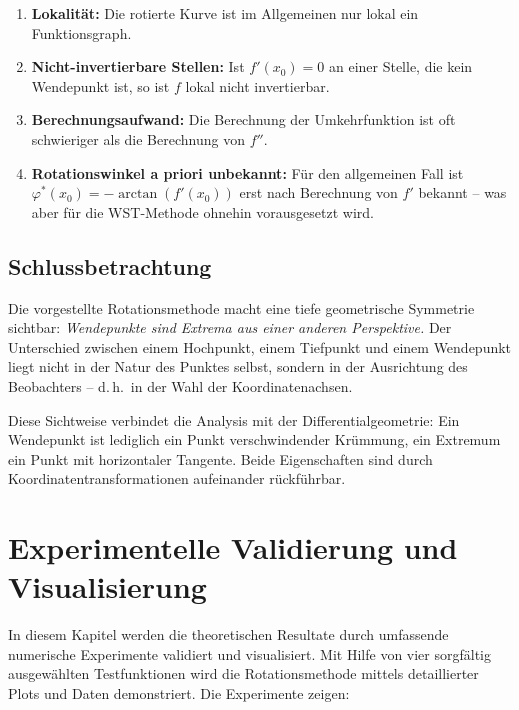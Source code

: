 ﻿\documentclass[12pt, a4paper]{article}
\theoremstyle{definition}
\begin{document}
	\begin{enumerate}[label=\arabic*.]
		\item \textbf{Lokalität:} Die rotierte Kurve ist im Allgemeinen nur lokal
		ein Funktionsgraph.
		
		\item \textbf{Nicht-invertierbare Stellen:} Ist $f'(x_0) = 0$ an einer
		Stelle, die kein Wendepunkt ist, so ist $f$ lokal nicht invertierbar.
		
		\item \textbf{Berechnungsaufwand:} Die Berechnung der Umkehrfunktion ist
		oft schwieriger als die Berechnung von $f''$.
		
		\item \textbf{Rotationswinkel a priori unbekannt:} Für den allgemeinen Fall
		ist $\varphi^*(x_0) = -\arctan(f'(x_0))$ erst nach Berechnung von $f'$
		bekannt -- was aber für die WST-Methode ohnehin vorausgesetzt wird.
	\end{enumerate}
	
	\subsection{Schlussbetrachtung}
	
	Die vorgestellte Rotationsmethode macht eine tiefe geometrische Symmetrie
	sichtbar: \emph{Wendepunkte sind Extrema aus einer anderen Perspektive.}
	Der Unterschied zwischen einem Hochpunkt, einem Tiefpunkt und einem
	Wendepunkt liegt nicht in der Natur des Punktes selbst, sondern in der
	Ausrichtung des Beobachters -- d.\,h.\ in der Wahl der Koordinatenachsen.
	
	Diese Sichtweise verbindet die Analysis mit der Differentialgeometrie: Ein
	Wendepunkt ist lediglich ein Punkt verschwindender Krümmung, ein Extremum
	ein Punkt mit horizontaler Tangente. Beide Eigenschaften sind durch
	Koordinatentransformationen aufeinander rückführbar.
	
	\section{Experimentelle Validierung und Visualisierung}
	\label{sec:experiments}
	
	In diesem Kapitel werden die theoretischen Resultate durch umfassende
	numerische Experimente validiert und visualisiert. Mit Hilfe von vier
	sorgfältig ausgewählten Testfunktionen wird die Rotationsmethode mittels
	detaillierter Plots und Daten demonstriert. Die Experimente zeigen:
	
\end{document}
